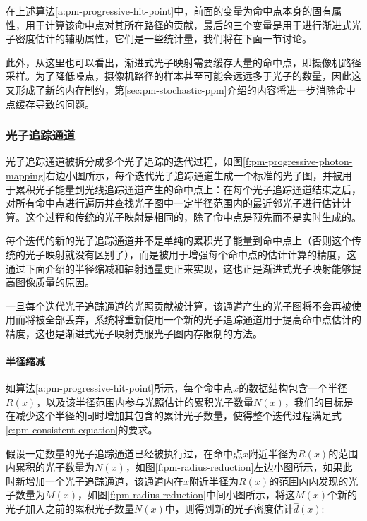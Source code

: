 在上述算法\ref{a:pm-progressive-hit-point}中，前面的变量为命中点本身的固有属性，用于计算该命中点对其所在路径的贡献，最后的三个变量是用于进行渐进式光子密度估计的辅助属性，它们是一些统计量，我们将在下面一节讨论。

此外，从这里也可以看出，渐进式光子映射需要缓存大量的命中点，即摄像机路径采样。为了降低噪点，摄像机路径的样本甚至可能会远远多于光子的数量，因此这又形成了新的内存制约，第\ref{sec:pm-stochastic-ppm}介绍的内容将进一步消除命中点缓存导致的问题。






\subsubsection{光子追踪通道}
光子追踪通道被拆分成多个光子追踪的迭代过程，如图\ref{f:pm-progressive-photon-mapping}右边小图所示，每个迭代光子追踪通道生成一个标准的光子图，并被用于累积光子能量到光线追踪通道产生的命中点上：在每个光子追踪通道结束之后，对所有命中点进行遍历并查找光子图中一定半径范围内的最近邻光子进行估计计算。这个过程和传统的光子映射是相同的，除了命中点是预先而不是实时生成的。

每个迭代的新的光子追踪通道并不是单纯的累积光子能量到命中点上（否则这个传统的光子映射就没有区别了），而是被用于增强每个命中点的估计计算的精度，这通过下面介绍的半径缩减和辐射通量更正来实现，这也正是渐进式光子映射能够提高图像质量的原因。

一旦每个迭代光子追踪通道的光照贡献被计算，该通道产生的光子图将不会再被使用而将被全部丢弃，系统将重新使用一个新的光子追踪通道用于提高命中点估计的精度，这也是渐进式光子映射克服光子图内存限制的方法。





\paragraph{半径缩减}
如算法\ref{a:pm-progressive-hit-point}所示，每个命中点$x$的数据结构包含一个半径$R(x)$，以及该半径范围内参与光照估计的累积光子数量$N(x)$，我们的目标是在减少这个半径的同时增加其包含的累计光子数量，使得整个迭代过程满足式\ref{e:pm-consistent-equation}的要求。

假设一定数量的光子追踪通道已经被执行过，在命中点$x$附近半径为$R(x)$的范围内累积的光子数量为$N(x)$，如图\ref{f:pm-radius-reduction}左边小图所示，如果此时新增加一个光子追踪通道，该通道内在$x$附近半径为$R(x)$的范围内内发现的光子数量为$M(x)$，如图\ref{f:pm-radius-reduction}中间小图所示，将这$M(x)$个新的光子加入之前的累积光子数量$N(x)$中，则得到新的光子密度估计$\hat{d}(x)$:

